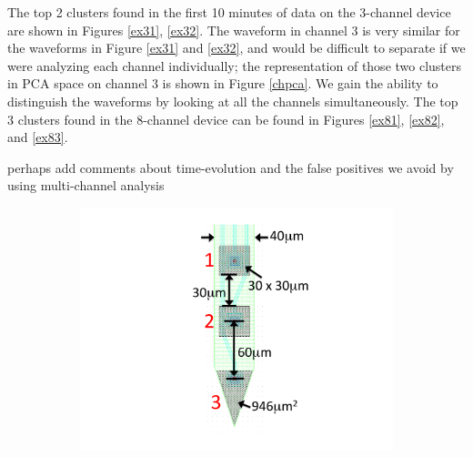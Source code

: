  The top 2 clusters found in the first 10 minutes of data on the 3-channel device are shown in Figures \ref{ex31}, \ref{ex32}.  The waveform in channel 3 is very similar for the waveforms in Figure \ref{ex31} and \ref{ex32}, and would be difficult to separate if we were analyzing each channel individually; the representation of those two clusters in PCA space on channel 3 is shown in Figure \ref{chpca}.  We gain the ability to distinguish the waveforms by looking at all the channels simultaneously.  The top 3 clusters found in the 8-channel device can be found in Figures \ref{ex81}, \ref{ex82}, and \ref{ex83}.

{\color{red} perhaps add comments about time-evolution and the false positives we avoid by using multi-channel analysis}


\begin{center}
\begin{figure}
\begin{subfigure}[b]{.12\textwidth}
\includegraphics[width=1\textwidth]{../figs/3dev}
\caption{}
\label{3dev}
\end{subfigure}
\begin{subfigure}[b]{.28\textwidth}

\end{subfigure}
\end{figure}
\end{center}
